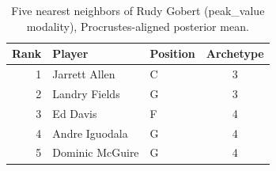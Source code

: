 \begin{table}[htbp]
  \centering\small
  \begin{tabular}{rllc}
    \toprule
    Rank & Player & Position & Archetype \\
    \midrule
    1 & Jarrett Allen & C & 3 \\
    2 & Landry Fields & G & 3 \\
    3 & Ed Davis & F & 4 \\
    4 & Andre Iguodala & G & 4 \\
    5 & Dominic McGuire & G & 4 \\
    \bottomrule
  \end{tabular}
  \caption{Five nearest neighbors of Rudy Gobert (peak_value modality), Procrustes-aligned posterior mean.}
  \label{tab:Rudy_Gobert_neighbors_peak_value}
\end{table}

